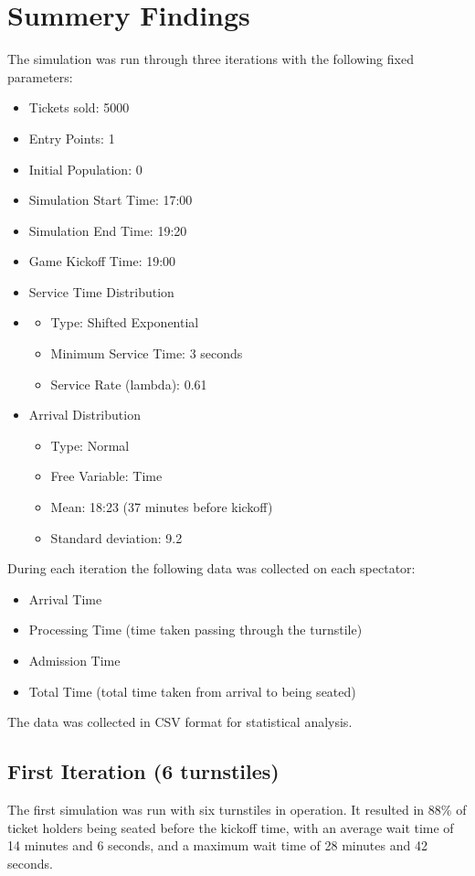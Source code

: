 \documentclass[11pt]{article}
\begin{document}
\section{Summery Findings}\label{sec:summery-findings}
The simulation was run through three iterations with the following fixed parameters:
\begin{itemize}
    \item Tickets sold: 5000
    \item Entry Points: 1
    \item Initial Population: 0
    \item Simulation Start Time: 17:00
    \item Simulation End Time: 19:20
    \item Game Kickoff Time: 19:00
    \item Service Time Distribution
    \item \begin{itemize}
              \item Type: Shifted Exponential
              \item Minimum Service Time: 3 seconds
              \item Service Rate (lambda): 0.61
    \end{itemize}
    \item Arrival Distribution
    \begin{itemize}
        \item Type: Normal
        \item Free Variable: Time
        \item Mean: 18:23 (37 minutes before kickoff)
        \item Standard deviation: 9.2
    \end{itemize}
\end{itemize}
    During each iteration the following data was collected on each spectator:
\begin{itemize}
    \item Arrival Time
    \item Processing Time (time taken passing through the turnstile)
    \item Admission Time
    \item Total Time (total time taken from arrival to being seated)
\end{itemize}
    The data was collected in CSV format for statistical analysis.
\subsection{First Iteration (6 turnstiles)}
    The first simulation was run with six turnstiles in operation.
    It resulted in 88\% of ticket holders being seated before the kickoff time, with an average wait time of 14 minutes
    and 6 seconds, and a maximum wait time of 28 minutes and 42 seconds.
\end{document}
